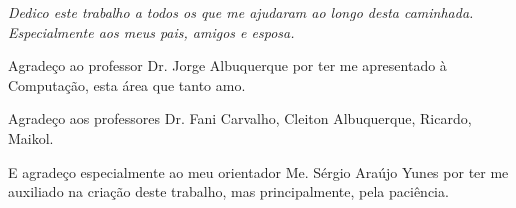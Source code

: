 \documentclass[
	12pt,				%
	openany,			%
	oneside,			%
	a4paper,			%
	english,			%
	brazil				%
	]{{Modelo/abntex2_FBUNI}}
\begin{document}


\frenchspacing 


\imprimircapa
\imprimirfolhaderosto*

%
%
\cleardoublepage

\begin{dedicatoria}
   \vspace*{\fill}
   \centering
   \noindent
   \textit{
    Dedico este trabalho a todos os que me ajudaram ao longo desta caminhada. Especialmente aos meus pais, amigos e esposa.
   }
   \vspace*{\fill}
\end{dedicatoria}

\begin{agradecimentos}
    Agradeço ao professor Dr. Jorge Albuquerque por ter me apresentado à Computação, esta área que tanto amo.
    
    Agradeço aos professores Dr. Fani Carvalho, Cleiton Albuquerque, Ricardo, Maikol.
    
    E agradeço especialmente ao meu orientador Me. Sérgio Araújo Yunes por ter me auxiliado na criação deste trabalho, mas principalmente, pela paciência.
    
\end{agradecimentos}
\end{document}
